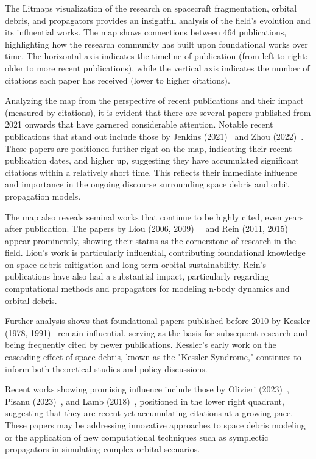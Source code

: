 \documentclass[journal ]{new-aiaa}
\begin{document}
The Litmaps visualization of the research on spacecraft fragmentation, orbital debris, and propagators provides an insightful analysis of the field’s evolution and its influential works. The map shows connections between 464 publications, highlighting how the research community has built upon foundational works over time. The horizontal axis indicates the timeline of publication (from left to right: older to more recent publications), while the vertical axis indicates the number of citations each paper has received (lower to higher citations).

Analyzing the map from the perspective of recent publications and their impact (measured by citations), it is evident that there are several papers published from 2021 onwards that have garnered considerable attention. Notable recent publications that stand out include those by Jenkins (2021)~\cite{jenkins_strathcube_2021} and Zhou (2022)~\cite{zhang_tde-based_2022}. These papers are positioned further right on the map, indicating their recent publication dates, and higher up, suggesting they have accumulated significant citations within a relatively short time. This reflects their immediate influence and importance in the ongoing discourse surrounding space debris and orbit propagation models.

The map also reveals seminal works that continue to be highly cited, even years after publication. The papers by Liou (2006, 2009)~\cite{liou_collision_2006}~\cite{liou_controlling_2010} and Rein (2011, 2015)~\cite{rein_rebound_2012}~\cite{rein_whfast_2015} appear prominently, showing their status as the cornerstone of research in the field. Liou’s work is particularly influential, contributing foundational knowledge on space debris mitigation and long-term orbital sustainability. Rein’s publications have also had a substantial impact, particularly regarding computational methods and propagators for modeling n-body dynamics and orbital debris.

Further analysis shows that foundational papers published before 2010 by Kessler (1978, 1991)~\cite{kessler_environment_1985} remain influential, serving as the basis for subsequent research and being frequently cited by newer publications. Kessler’s early work on the cascading effect of space debris, known as the "Kessler Syndrome," continues to inform both theoretical studies and policy discussions.

Recent works showing promising influence include those by Olivieri (2023)~\cite{olivieri_analysis_2023}, Pisanu (2023)~\cite{pisanu_recent_2021}, and Lamb (2018)~\cite{h_lamb_space_2018}, positioned in the lower right quadrant, suggesting that they are recent yet accumulating citations at a growing pace. These papers may be addressing innovative approaches to space debris modeling or the application of new computational techniques such as symplectic propagators in simulating complex orbital scenarios.
\end{document}
